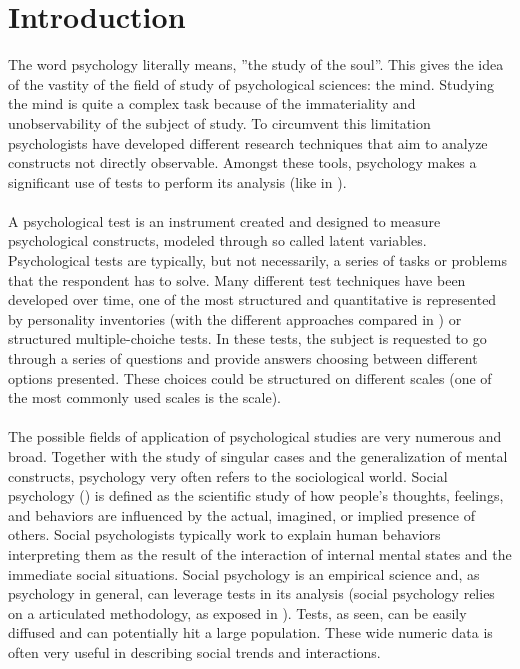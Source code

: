 \section{Introduction}

The word psychology literally means, ”the study of the soul”. This gives the idea of the vastity of the ﬁeld of study of psychological sciences: the mind.
Studying the mind is quite a complex task because of the immateriality and unobservability of the subject of study.
To circumvent this limitation psychologists have developed different research techniques that aim to analyze constructs not directly observable.
Amongst these tools, psychology makes a signiﬁcant use of tests to perform its analysis (like in \cite{Cohen-1992}).\\
\\
A psychological test is an instrument created and designed to measure psychological constructs, modeled through so called latent variables.
Psychological tests are typically, but not necessarily, a series of tasks or problems that the respondent has to solve.
Many different test techniques have been developed over time, one of the most structured and quantitative is represented by personality inventories
(with the different approaches compared in \cite{Burisch-1984}) or structured multiple-choiche tests.
In these tests, the subject is requested to go through a series of questions and provide answers choosing between different options presented.
These choices could be structured on different scales (one of the most commonly used scales is the \cite{Likert-1932} scale).\\
\\
The possible ﬁelds of application of psychological studies are very numerous and broad.
Together with the study of singular cases and the generalization of mental constructs, psychology very often refers to the sociological world.
Social psychology (\cite{Smith-2006}) is deﬁned as the scientiﬁc study of how people’s thoughts, feelings, and behaviors are inﬂuenced by the actual, imagined,
or implied presence of others.
Social psychologists typically work to explain human behaviors interpreting them as the result of the interaction of internal mental states and the immediate
social situations.
Social psychology is an empirical science and, as psychology in general, can leverage tests in its analysis (social psychology relies on a articulated methodology,
as exposed in \cite{Reis-2000}).
Tests, as seen, can be easily diffused and can potentially hit a large population.
These wide numeric data is often very useful in describing social trends and interactions.\\
